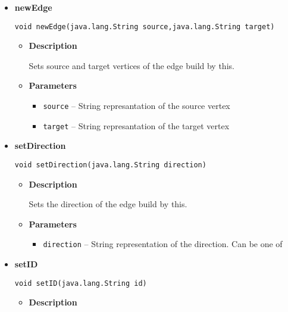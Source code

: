 {{{{{{{{\begin{itemize}
{\begin{itemize}
{Adds additional data to this edge. The specific EdgeBuilder implementation needs to decide how to save the value for given edge type.
}
\item{
{\bf  Parameters}
  \begin{itemize}
   \item{
\texttt{keyname} -- }
   \item{
\texttt{value} -- }
  \end{itemize}
}%
\end{itemize}
}%
\item{ 
{\bf  newEdge}\\
\begin{lstlisting}[frame=none]
void newEdge(java.lang.String source,java.lang.String target)\end{lstlisting} %
\begin{itemize}
\item{
{\bf  Description}

Sets source and target vertices of the edge build by this.
}
\item{
{\bf  Parameters}
  \begin{itemize}
   \item{
\texttt{source} -- String represantation of the source vertex}
   \item{
\texttt{target} -- String represantation of the target vertex}
  \end{itemize}
}%
\end{itemize}
}%
\item{ 
{\bf  setDirection}\\
\begin{lstlisting}[frame=none]
void setDirection(java.lang.String direction)\end{lstlisting} %
\begin{itemize}
\item{
{\bf  Description}

Sets the direction of the edge build by this.
}
\item{
{\bf  Parameters}
  \begin{itemize}
   \item{
\texttt{direction} -- String representation of the direction. Can be one of}
  \end{itemize}
}%
\end{itemize}
}%
\item{ 
{\bf  setID}\\
\begin{lstlisting}[frame=none]
void setID(java.lang.String id)\end{lstlisting} %
\begin{itemize}
\item{
{\bf  Description}

}
\end{itemize}}
\end{itemize}}}}}}}}}
